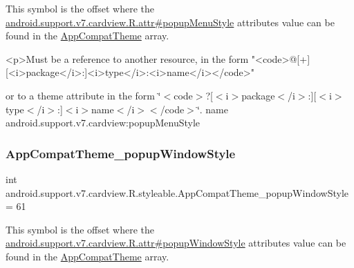 This symbol is the offset where the \hyperlink{classandroid_1_1support_1_1v7_1_1cardview_1_1R_1_1attr_a3328e29cb8910dba77e81a6963e84125}{android.\+support.\+v7.\+cardview.\+R.\+attr\#popup\+Menu\+Style} attribute\textquotesingle{}s value can be found in the \hyperlink{classandroid_1_1support_1_1v7_1_1cardview_1_1R_1_1styleable_a52e6f69f954ecc2622d72c0b4d298938}{App\+Compat\+Theme} array.

\begin{DoxyVerb}      <p>Must be a reference to another resource, in the form "<code>@[+][<i>package</i>:]<i>type</i>:<i>name</i></code>"
\end{DoxyVerb}
 or to a theme attribute in the form \char`\"{}$<$code$>$?\mbox{[}$<$i$>$package$<$/i$>$\+:\mbox{]}\mbox{[}$<$i$>$type$<$/i$>$\+:\mbox{]}$<$i$>$name$<$/i$>$$<$/code$>$\char`\"{}.  name android.\+support.\+v7.\+cardview\+:popup\+Menu\+Style \mbox{\label{classandroid_1_1support_1_1v7_1_1cardview_1_1R_1_1styleable_a6bbd99358284cc2f4f173afb1fe1bd7c}} 
\subsubsection{\texorpdfstring{App\+Compat\+Theme\+\_\+popup\+Window\+Style}{AppCompatTheme\_popupWindowStyle}}
{\footnotesize\ttfamily int android.\+support.\+v7.\+cardview.\+R.\+styleable.\+App\+Compat\+Theme\+\_\+popup\+Window\+Style = 61\hspace{0.3cm}{\ttfamily [static]}}

This symbol is the offset where the \hyperlink{classandroid_1_1support_1_1v7_1_1cardview_1_1R_1_1attr_a1ecca8fae6e4b82298fa9804db40fbaa}{android.\+support.\+v7.\+cardview.\+R.\+attr\#popup\+Window\+Style} attribute\textquotesingle{}s value can be found in the \hyperlink{classandroid_1_1support_1_1v7_1_1cardview_1_1R_1_1styleable_a52e6f69f954ecc2622d72c0b4d298938}{App\+Compat\+Theme} array.

